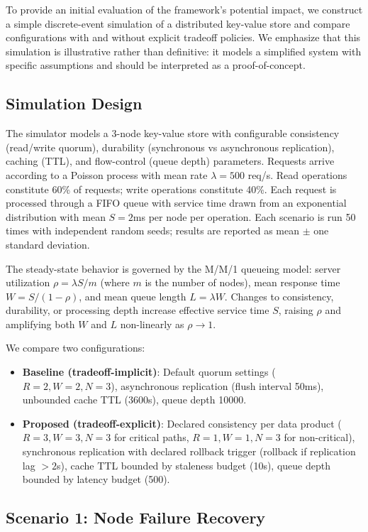 \documentclass[conference]{IEEEtran}
\begin{document}
To provide an initial evaluation of the framework's potential impact, we construct a simple discrete-event simulation of a distributed key-value store and compare configurations with and without explicit tradeoff policies. We emphasize that this simulation is illustrative rather than definitive: it models a simplified system with specific assumptions and should be interpreted as a proof-of-concept.

\subsection{Simulation Design}

The simulator models a 3-node key-value store with configurable consistency (read/write quorum), durability (synchronous vs asynchronous replication), caching (TTL), and flow-control (queue depth) parameters. Requests arrive according to a Poisson process with mean rate $\lambda = 500$ req/s. Read operations constitute 60\% of requests; write operations constitute 40\%. Each request is processed through a FIFO queue with service time drawn from an exponential distribution with mean $S = 2$ms per node per operation. Each scenario is run 50 times with independent random seeds; results are reported as mean $\pm$ one standard deviation.

The steady-state behavior is governed by the M/M/1 queueing model: server utilization $\rho = \lambda S / m$ (where $m$ is the number of nodes), mean response time $W = S/(1-\rho)$, and mean queue length $L = \lambda W$. Changes to consistency, durability, or processing depth increase effective service time $S$, raising $\rho$ and amplifying both $W$ and $L$ non-linearly as $\rho \to 1$.

We compare two configurations:
\begin{itemize}
    \item \textbf{Baseline (tradeoff-implicit)}: Default quorum settings ($R=2, W=2, N=3$), asynchronous replication (flush interval 50ms), unbounded cache TTL (3600s), queue depth 10000.
    \item \textbf{Proposed (tradeoff-explicit)}: Declared consistency per data product ($R=3, W=3, N=3$ for critical paths, $R=1, W=1, N=3$ for non-critical), synchronous replication with declared rollback trigger (rollback if replication lag $> 2$s), cache TTL bounded by staleness budget (10s), queue depth bounded by latency budget (500).
\end{itemize}

\subsection{Scenario 1: Node Failure Recovery}
\end{document}

